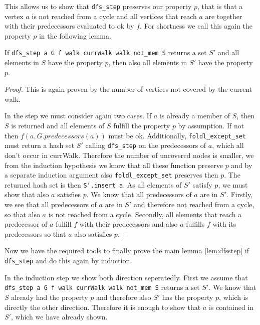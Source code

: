 This allows us to show that \texttt{dfs\_step} preserves our property $p$, that is that a vertex $a$ is not reached from a cycle and all vertices that reach $a$ are together with their predecessors evaluated to ok by $f$. For shortness we call this again the property $p$ in the following lemma.

\begin{lemma}
    If \texttt{dfs\_step a G f walk currWalk walk not\_mem S} returns a set $S'$ and all elements in $S$ have the property $p$, then also all elements in $S'$ have the property $p$.
\end{lemma}
\begin{proof}
    This is again proven by the number of vertices not covered by the current walk. 

    In the step we must consider again two cases. If $a$ is already a member of $S$, then $S$ is returned and all elements of $S$ fulfill the property $p$ by assumption. If not then $f(a, G.predecessors(a))$ must be ok. Additionally, \texttt{foldl\_except\_set} must return a hash set $S'$ calling \texttt{dfs\_step} on the predecessors of $a$, which all don't occur in currWalk. Therefore the number of uncovered nodes is smaller, we from the induction hypothesis we know that all these function preserve $p$ and by a separate induction argument also \texttt{foldl\_except\_set} preserves then $p$. The returned hash set is then \texttt{S'.insert a}. As all elements of $S'$ satisfy $p$, we must show that also $a$ satisfies $p$. We know that all predecessors of $a$ are in $S'$.  Firstly, we see that all predecessors of $a$ are in $S'$ and therefore not reached from a cycle, so that also $a$ is not reached from a cycle. Secondly, all elements that reach a predecessor of $a$ fulfill $f$ with their predecessors and also $a$ fulfills $f$ with its predecessors so that $a$ also satisfies $p$.
\end{proof}

Now we have the required tools to finally prove the main lemma \ref{lem:dfsstep} if \texttt{dfs\_step} and do this again by induction.

In the induction step we show both direction seperatedly. First we assume that \texttt{dfs\_step a G f walk currWalk walk not\_mem S} returns a set $S'$. We know that $S$ already had the property $p$ and therefore also $S'$ has the property $p$, which is directly the other direction. Therefore it is enough to show that $a$ is contained in $S'$, which we have already shown.

